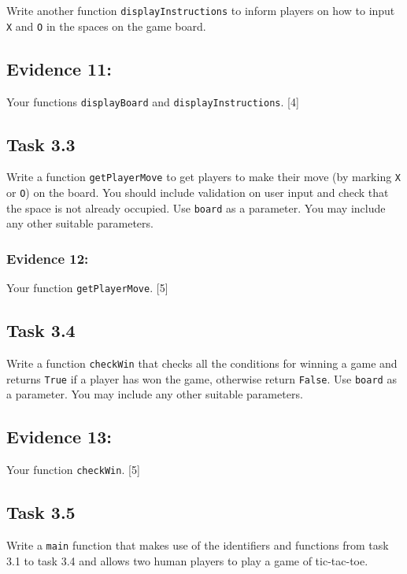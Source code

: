 Write another function \texttt{displayInstructions} to inform players
on how to input \texttt{X} and \texttt{O} in the spaces on the game
board. 

\subsection*{Evidence 11: }

Your functions \texttt{displayBoard} and \texttt{displayInstructions}.
\hfill{}{[}4{]}

\subsection*{Task 3.3 }

Write a function \texttt{getPlayerMove} to get players to make their
move (by marking \texttt{X} or \texttt{O}) on the board. You should
include validation on user input and check that the space is not already
occupied. Use \texttt{board} as a parameter. You may include any other
suitable parameters. 

\subsubsection*{Evidence 12: }

Your function \texttt{getPlayerMove}. \hfill{}{[}5{]}

\subsection*{Task 3.4 }

Write a function \texttt{checkWin} that checks all the conditions
for winning a game and returns \texttt{True} if a player has won the
game, otherwise return \texttt{False}. Use \texttt{board} as a parameter.
You may include any other suitable parameters. 

\subsection*{Evidence 13:}

Your function \texttt{checkWin}. \hfill{}{[}5{]}

\subsection*{Task 3.5}

Write a \texttt{main} function that makes use of the identifiers and
functions from task 3.1 to task 3.4 and allows two human players to
play a game of tic-tac-toe.


